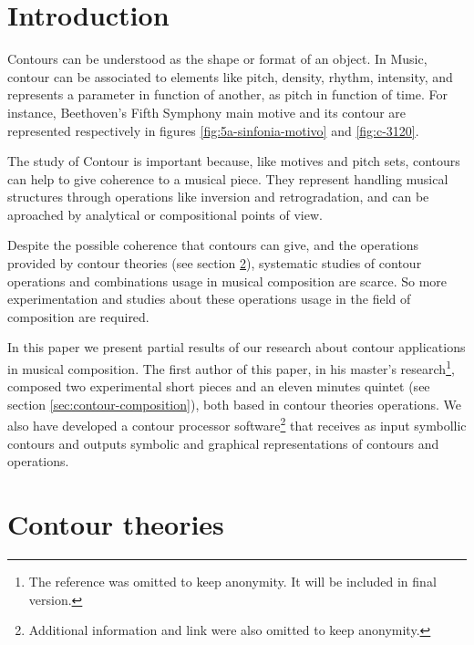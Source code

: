 

\section{Introduction}
\label{sec:introduction}

Contours can be understood as the shape or format of an object. In
Music, contour can be associated to elements like pitch, density,
rhythm, intensity, and represents a parameter in function of another,
as pitch in function of time. For instance, Beethoven's Fifth Symphony
main motive and its contour are represented respectively in figures
\ref{fig:5a-sinfonia-motivo} and \ref{fig:c-3120}.

The study of Contour is important because, like motives and pitch
sets, contours can help to give coherence to a musical piece. They
represent handling musical structures through operations like
inversion and retrogradation, and can be aproached by analytical or
compositional points of view.

Despite the possible coherence that contours can give, and the
operations provided by contour theories (see section
\ref{sec:contour-theories}), systematic studies of contour operations
and combinations usage in musical composition are scarce. So more
experimentation and studies about these operations usage in the field
of composition are required.

In this paper we present partial results of our research about contour
applications in musical composition. The first author of this paper,
in his master's research\footnote{The reference was omitted to keep
  anonymity. It will be included in final version.}, composed two
experimental short pieces and an eleven minutes quintet (see section
\ref{sec:contour-composition}), both based in contour theories
operations. We also have developed a contour processor
software\footnote{Additional information and link were also omitted to
  keep anonymity.} that receives as input symbollic contours and
outputs symbolic and graphical representations of contours and
operations.

\section{Contour theories}
\label{sec:contour-theories}

